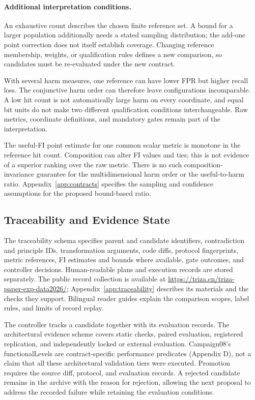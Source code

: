 \documentclass[manuscript,screen,nonacm]{acmart}
\begin{document}
\paragraph{Additional interpretation conditions.}
An exhaustive count describes the chosen finite reference set. A bound for
a larger population additionally needs a stated sampling distribution;
the add-one point correction does not itself establish coverage.
Changing reference membership, weights, or qualification rules defines a
new comparison, so candidates must be re-evaluated under the new contract.

With several harm measures, one reference can have lower FPR but higher
recall loss. The conjunctive harm order can therefore leave configurations
incomparable. A low hit count is not automatically large harm on every
coordinate, and equal bit units do not make two different qualification
conditions interchangeable. Raw metrics, coordinate definitions, and
mandatory gates remain part of the interpretation.

The useful-FI point estimate for one common scalar metric is monotone in
the reference hit count. Composition can alter FI values and ties; this is
not evidence of a superior ranking over the raw metric. There is no such
composition-invariance guarantee for the multidimensional harm order or
the useful-to-harm ratio. Appendix~\ref{app:contracts} specifies the
sampling and confidence assumptions for the proposed bound-based ratio.

\subsection{Traceability and Evidence State}
\label{sec:traceability}
The traceability schema specifies parent and candidate identifiers,
contradiction and principle IDs, transformation arguments, code diffs,
protocol fingerprints, metric references, FI estimates and bounds where
available, gate outcomes, and controller decisions.
Human-readable plans and execution records are stored separately.
The public record collection is available at
\url{https://triza.cn/triza-paper-exp-data2026/}; Appendix~\ref{app:traceability}
describes its materials and the checks they support. Bilingual reader guides
explain the comparison scopes, label rules, and limits of record replay.

The controller tracks a candidate together with its evaluation records. The architectural evidence scheme covers static checks, paired evaluation, registered replication, and independently locked or external evaluation. Campaign08's functionalLevels are contract-specific performance predicates (Appendix D), not a claim that all these architectural validation tiers were executed. Promotion requires the source diff, protocol, and evaluation records. A rejected candidate remains in the archive with the reason for rejection, allowing the next proposal to address the recorded failure while retaining the evaluation conditions.
\end{document}
